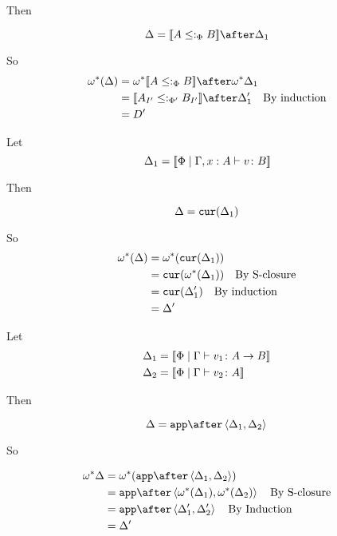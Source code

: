 {Then

\begin{equation}
    \D = \deno{A\subtypep B}\after \D_1\\
\end{equation}

So 
\begin{align}
    \w\star(\D) & = \w\star{\deno{A\subtypep B}}\after\w\star\D_1 \\
    & = \deno{A_{I'}\subtypepp B_{I'}}\after\D_1'\qt{By induction}\\
    & = D'
\end{align}

Let \begin{equation}
    \Delta_1 = {\bf [\![}\Phi\mid\Gamma, x: A \vdash v \colon B{\bf ]\!]}
\end{equation}

Then

\begin{equation}
    \Delta = \texttt{cur}(\Delta_1)\\
\end{equation}

So
\begin{align}
    \omega^*(\Delta) & = \omega^*(\texttt{cur}(\Delta_1))\\
    & = \texttt{cur}(\omega^*(\Delta_1))\quad\text{By S-closure}\\
    & = \texttt{cur}(\Delta_1')\quad\text{By induction}\\
    & = \Delta'
\end{align}

Let \begin{align}
    \Delta_1 &= {\bf [\![}\Phi\mid\Gamma \vdash v_1 \colon A\rightarrow B{\bf ]\!]}\\
    \Delta_2 &= {\bf [\![}\Phi\mid\Gamma \vdash v_2 \colon A{\bf ]\!]}
\end{align}

Then

\begin{equation}
    \D = \app\after\pr{\D_1}{\D_2}\\
\end{equation}

So

\begin{align}
    \w\star\D & = \w\star(\app\after\pr{\D_1}{\D_2})\\
    & = \app\after\pr{\w\star(\D_1)}{\w\star(\D_2)}\qt{By S-closure}\\
    & = \app\after\pr{\D_1'}{\D_2'}\qt{By Induction}\\
    & = \D'
\end{align}

}
